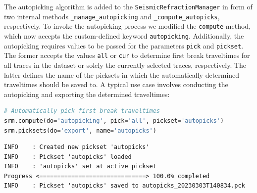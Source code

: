 \documentclass[a4paper,fleqn]{cas-sc}
\begin{document}
The autopicking algorithm is added to the \texttt{SeismicRefractionManager} in form of two internal methods \texttt{\_manage\_autopicking} and \texttt{\_compute\_autopicks}, respectively. To invoke the autopicking process we modified the \texttt{compute} method, which now accepts the custom-defined keyword \texttt{autopicking}. Additionally, the autopicking requires values to be passed for the parameters \texttt{pick} and \texttt{pickset}. The former accepts the values \texttt{all} or \texttt{cur} to determine first break traveltimes for all traces in the dataset or solely the currently selected traces, respectively. The latter defines the name of the picksets in which the automatically determined traveltimes should be saved to. A typical use case involves conducting the autopicking and exporting the determined traveltimes:
\begin{lstlisting}[language=Python, firstnumber=24]
# Automatically pick first break traveltimes
srm.compute(do='autopicking', pick='all', pickset='autopicks')
srm.picksets(do='export', name='autopicks')
\end{lstlisting}
\begin{footnotesize}
\begin{verbatim}
INFO    : Created new pickset 'autopicks'
INFO    : Pickset 'autopicks' loaded
INFO    : 'autopicks' set at active pickset
Progress <==============================> 100.0% completed
INFO    : Pickset 'autopicks' saved to autopicks_20230303T140834.pck
\end{verbatim}
\end{footnotesize}
\end{document}
